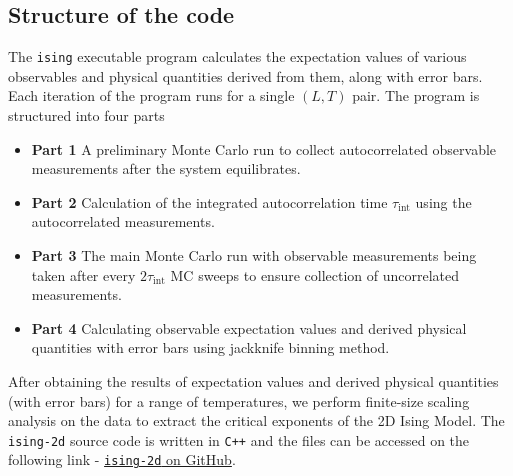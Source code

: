 \documentclass[../thesis_main.tex]{subfiles}
\begin{document}
\subsection{Structure of the code}
The \texttt{ising} executable program calculates the expectation values of various observables and physical quantities derived from them, along with error bars. Each iteration of the program runs for a single $(L, T)$ pair. The program is structured into four parts
\begin{itemize}[label={}]
    \item \textbf{Part 1} \:\:\: A preliminary Monte Carlo run to collect autocorrelated observable measurements after the system equilibrates.
    \item \textbf{Part 2} \:\:\: Calculation of the integrated autocorrelation time $\tau_\text{int}$ using the autocorrelated measurements. 
    \item \textbf{Part 3} \:\:\: The main Monte Carlo run with observable measurements being taken after every $2\tau_\text{int}$ MC sweeps to ensure collection of uncorrelated measurements.
    \item \textbf{Part 4} \:\:\: Calculating observable expectation values and derived physical quantities with error bars using jackknife binning method.  
\end{itemize} 
After obtaining the results of expectation values and derived physical quantities (with error bars) for a range of temperatures, we perform finite-size scaling analysis on the data to extract the critical exponents of the 2D Ising Model. The \texttt{ising-2d} source code is written in \texttt{C++} and the files can be accessed on the following link - \href{https://github.com/kunal1729verma/ising-2d}{\texttt{ising-2d} on GitHub}.
\end{document}

